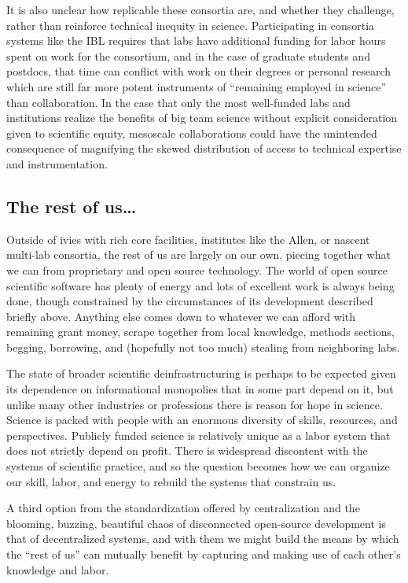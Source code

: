 \documentclass[notoc]{tufte-book}
\begin{document}
It is also unclear how replicable these consortia are, and whether they
challenge, rather than reinforce technical inequity in science.
Participating in consortia systems like the IBL requires that labs have
additional funding for labor hours spent on work for the consortium, and
in the case of graduate students and postdocs, that time can conflict
with work on their degrees or personal research which are still far more
potent instruments of ``remaining employed in science'' than
collaboration. In the case that only the most well-funded labs and
institutions realize the benefits of big team science without explicit
consideration given to scientific equity, mesoscale collaborations could
have the unintended consequence of magnifying the skewed distribution of
access to technical expertise and instrumentation.


\subsection{The rest of us\ldots{}}

Outside of ivies with rich core facilities, institutes like the Allen,
or nascent multi-lab consortia, the rest of us are largely on our own,
piecing together what we can from proprietary and open source
technology. The world of open source scientific software has plenty of
energy and lots of excellent work is always being done, though
constrained by the circumstances of its development described briefly
above. Anything else comes down to whatever we can afford with remaining
grant money, scrape together from local knowledge, methods sections,
begging, borrowing, and (hopefully not too much) stealing from
neighboring labs.

The state of broader scientific deinfrastructuring is perhaps to be
expected given its dependence on informational monopolies that in some
part depend on it, but unlike many other industries or professions there
is reason for hope in science. Science is packed with people with an
enormous diversity of skills, resources, and perspectives. Publicly
funded science is relatively unique as a labor system that does not
strictly depend on profit. There is widespread discontent with the
systems of scientific practice, and so the question becomes how we can
organize our skill, labor, and energy to rebuild the systems that
constrain us.

A third option from the standardization offered by centralization and
the blooming, buzzing, beautiful chaos of disconnected open-source
development is that of decentralized systems, and with them we might
build the means by which the ``rest of us'' can mutually benefit by
capturing and making use of each other's knowledge and labor.
\end{document}
